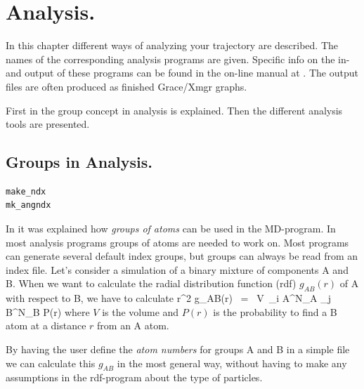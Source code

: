 %
% 
% 
% 
% 
% 
% 
% 
% 
%

\chapter{Analysis.}
\label{ch:analysis}
In this chapter different ways of analyzing your trajectory are described. 
The names of the corresponding analysis programs are given. 
Specific info on the in- and output of these programs can be found 
in the on-line manual at {\wwwpage}.
The output files are often produced as finished Grace/Xmgr graphs.

First in  the group concept in analysis is explained. 
Then the different analysis tools are presented.


\section{Groups in Analysis.}
\label{sec:groups}
\begin{verbatim}
make_ndx
mk_angndx
\end{verbatim}
In  it was explained how {\em groups of
atoms} can be used in the MD-program.  In most analysis programs groups
of atoms are needed to work on. Most programs can generate several default
index groups, but groups can always be read from an index file. Let's
consider a simulation of a binary mixture of components A and B. When
we want to calculate the radial distribution function (rdf)
$g_{AB}(r)$ of A with respect to B, we have to calculate
\pi r^2 g_{AB}(r)      ~=~     V~\sum_{i \in A}^{N_A} \sum_{j \in B}^{N_B} P(r)
\eeq
where $V$ is the volume and $P(r)$ is the probability to find a B atom
at a distance $r$ from an A atom.

By having the user define the {\em atom numbers} for groups A and B in
a simple file we can calculate this $g_{AB}$ in the most general way, without
having to make any assumptions in the rdf-program about the type of 
particles. 

